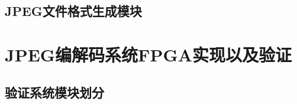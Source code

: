 \documentclass{article}
\numberwithin {equation}{section}
\begin{document}
\begin{spacing}{1.25}
  \subsection{JPEG文件格式生成模块}
    \vspace{1em}

\newpage
\section{JPEG编解码系统FPGA实现以及验证}
  \subsection{验证系统模块划分}
\newpage



\end{spacing}
\end{document}
